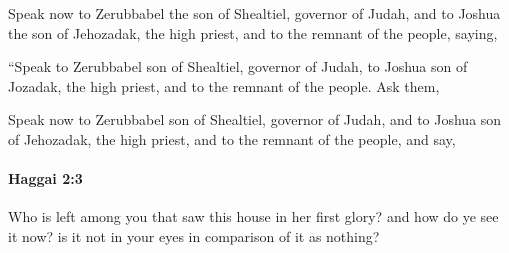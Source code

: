 			\begin{versebox}
					\item[BHS] 
					\item[LXX] 
					\item[ASV] Speak now to Zerubbabel the son of Shealtiel, governor of Judah, and to Joshua the son of Jehozadak, the high priest, and to the remnant of the people, saying,
					\item[NIV] “Speak to Zerubbabel son of Shealtiel, governor of Judah, to Joshua son of Jozadak, the high priest, and to the remnant of the people. Ask them,
					\item[NRSV] Speak now to Zerubbabel son of Shealtiel, governor of Judah, and to Joshua son of Jehozadak, the high priest, and to the remnant of the people, and say,
			\end{versebox}

		\paragraph{Haggai 2:3} %
			\label{HAGGAI-2-3}

			Who is left among you that saw this house in her first glory? and how do ye see it now? is it not in your eyes in comparison of it as nothing?

